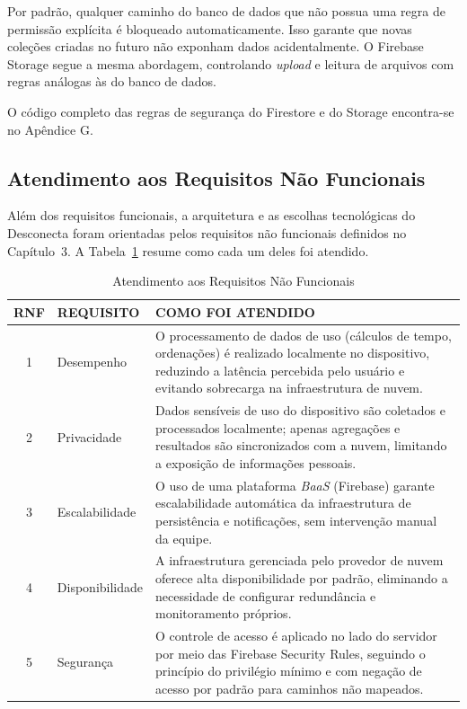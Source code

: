 Por padrão, qualquer caminho do banco de dados que não possua uma regra de permissão explícita é bloqueado automaticamente. Isso garante que novas coleções criadas no futuro não exponham dados acidentalmente. O Firebase Storage segue a mesma abordagem, controlando \textit{upload} e leitura de arquivos com regras análogas às do banco de dados.

O código completo das regras de segurança do Firestore e do Storage encontra-se no Apêndice G.

\subsection{Atendimento aos Requisitos Não Funcionais}

Além dos requisitos funcionais, a arquitetura e as escolhas tecnológicas do Desconecta foram orientadas pelos requisitos não funcionais definidos no Capítulo~3. A Tabela~\ref{tab:rnf} resume como cada um deles foi atendido.

\begin{table}[H]
\centering
\caption{Atendimento aos Requisitos Não Funcionais}
\label{tab:rnf}
\begin{tabularx}{\textwidth}{|c|l|X|}
\hline
\rowcolor{verdeclaro}
\textbf{RNF} & \textbf{REQUISITO} & \textbf{COMO FOI ATENDIDO} \\ \hline

1 & Desempenho &
O processamento de dados de uso (cálculos de tempo, ordenações) é realizado localmente no dispositivo, reduzindo a latência percebida pelo usuário e evitando sobrecarga na infraestrutura de nuvem. \\ \hline

2 & Privacidade &
Dados sensíveis de uso do dispositivo são coletados e processados localmente; apenas agregações e resultados são sincronizados com a nuvem, limitando a exposição de informações pessoais. \\ \hline

3 & Escalabilidade &
O uso de uma plataforma \textit{BaaS} (Firebase) garante es\-ca\-la\-bi\-li\-da\-de automática da infraestrutura de persistência e notificações, sem intervenção manual da equipe. \\ \hline

4 & Disponibilidade &
A infraestrutura gerenciada pelo provedor de nuvem oferece alta disponibilidade por padrão, eliminando a necessidade de configurar redundância e monitoramento próprios. \\ \hline

5 & Segurança &
O controle de acesso é aplicado no lado do servidor por meio das Firebase Security Rules, seguindo o princípio do privilégio mínimo e com negação de acesso por padrão para caminhos não mapeados. \\ \hline

\end{tabularx}
\end{table}